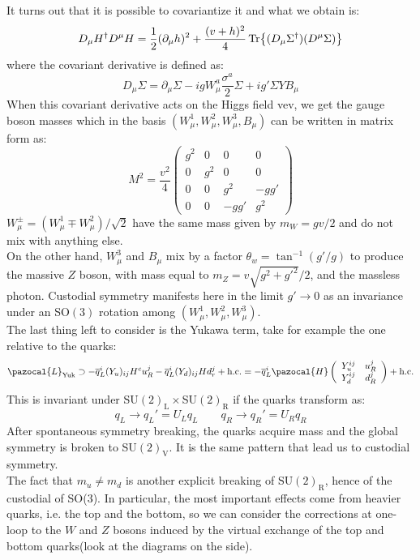 \documentclass[../main.tex]{subfiles}
\begin{document}
It turns out that it is possible to covariantize it and what we obtain is:
\[
D_\mu H^\dagger D^\mu H=\frac{1}{2}(\partial_\mu h)^2+\frac{(v+h)^2}{4}\Tr{(D_\mu\Sigma^\dagger)(D^\mu\Sigma)}
\]
where the covariant derivative is defined as:
\[
D_\mu\Sigma=\partial_\mu\Sigma-igW_\mu^a\frac{\sigma^a}{2}\Sigma+ig'\Sigma YB_\mu
\]
When this covariant derivative acts on the Higgs field vev, we get the gauge boson masses which in the basis $(W_\mu^1,W_\mu^2,W_\mu^3,B_\mu)$ can be written in matrix form as:
\[
M^2=\frac{v^2}{4}\left(\begin{array}{cccc}
g^2 & 0 & 0 & 0 \\
0 & g^2 & 0 & 0 \\
0 & 0 & g^2 & -gg' \\
0 & 0 & -gg' & g^2
\end{array}\right)
\]
$W_\mu^\pm=(W_\mu^1\mp W_\mu^2)/\sqrt{2}$ have the same mass given by $m_W=gv/2$ and do not mix with anything else.\\
On the other hand, $W_\mu^3$ and $B_\mu$ mix by a factor $\theta_w=\tan^{-1}(g'/g)$ to produce the massive $Z$ boson, with mass equal to $m_Z=v\sqrt{g^2+g'^2}/2$, and the massless photon. Custodial symmetry manifests here in the limit $g'\to0$ as an invariance under an SO$(3)$ rotation among $(W_\mu^1,W_\mu^2,W_\mu^3)$.\\
The last thing left to consider is the Yukawa term, take for example the one relative to the quarks:
\[
\pazocal{L}_{\text{Yuk}}\supset-\overline{q}_L^i(Y_u)_{ij}H^cu_R^j-\overline{q}_L^i(Y_d)_{ij}Hd_r^j+\text{h.c.}=-\overline{q}_L^i\pazocal{H}\left(\begin{array}{cc}
    Y_u^{ij} & u_R^j \\
    Y_d^{ij} & d_R^j
\end{array}\right)+\text{h.c.}
\]
This is invariant under SU$(2)_{\text{L}}\times$SU$(2)_{\text{R}}$ if the quarks transform as:
\[
q_L\to q_L'=U_Lq_L \qquad q_R\to q_R'=U_Rq_R
\]
After spontaneous symmetry breaking, the quarks acquire mass and the global symmetry is broken to SU$(2)_{\text{V}}$. It is the same pattern that lead us to custodial symmetry.\\
The fact that $m_u\neq m_d$ is another explicit breaking of SU$(2)_{\text{R}}$, hence of the custodial of SO(3). In particular, the most important effects come from heavier quarks, i.e. the top and the bottom, so we can consider the corrections at one-loop to the $W$ and $Z$ bosons induced by the virtual exchange of the top and bottom quarks(look at the diagrams on the side).\\
\end{document}
